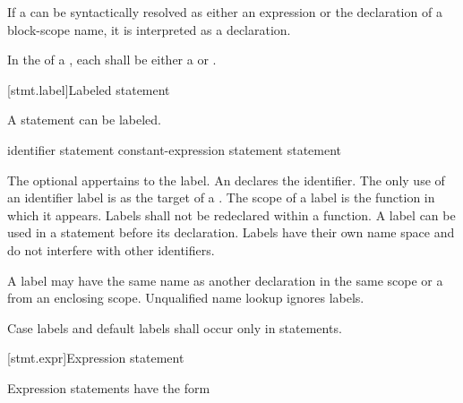 \pnum
If a  can be syntactically resolved as either an
expression or the declaration of a block-scope name, it is interpreted as a
declaration.

\pnum
In the  of a , each
 shall be either a 
or .

[stmt.label]{Labeled statement}%

\pnum
{}%
%
A statement can be labeled.

\begin{bnf}
\br
     identifier \terminal{:} statement\br
      constant-expression \terminal{:} statement\br
      \terminal{:} statement
\end{bnf}

The optional  appertains to the label. An
 declares the identifier. The only use of an
identifier label is as the target of a
%
.
%
The scope of a label is the function in which it appears. Labels shall
not be redeclared within a function. A label can be used in a
 statement before its declaration.
%
Labels have their own name space and do not interfere with other
identifiers.
\begin{note}
A label may have the same name as another declaration in the same scope or a
 from an enclosing scope. Unqualified name
lookup ignores labels.
\end{note}

\pnum
{}%
%
Case labels and default labels shall occur only in  statements.


[stmt.expr]{Expression statement}%

\pnum
Expression statements have the form

\begin{bnf}
\br
     \terminal{;}
\end{bnf}

